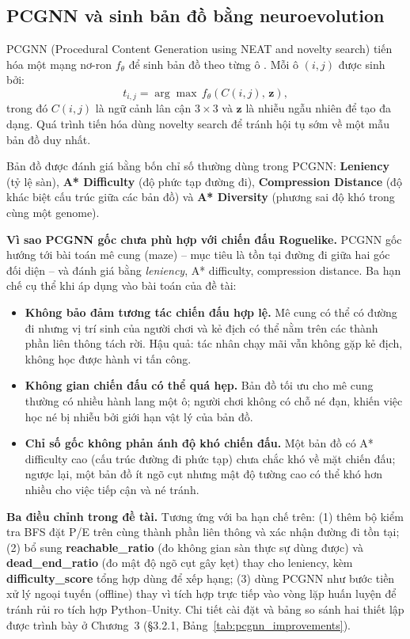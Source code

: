 \subsection{PCGNN và sinh bản đồ bằng neuroevolution}

PCGNN (Procedural Content Generation using NEAT and novelty search) tiến hóa một mạng nơ-ron $f_\theta$ để sinh bản đồ theo từng ô \cite{Beukman2022}. Mỗi ô $(i,j)$ được sinh bởi:
\begin{equation}
    t_{i,j} = \arg\max\, f_\theta(C(i,j),\, \mathbf{z}),
\end{equation}
trong đó $C(i,j)$ là ngữ cảnh lân cận $3\times3$ và $\mathbf{z}$ là nhiễu ngẫu nhiên để tạo đa dạng. Quá trình tiến hóa dùng novelty search để tránh hội tụ sớm về một mẫu bản đồ duy nhất.

Bản đồ được đánh giá bằng bốn chỉ số thường dùng trong PCGNN: \textbf{Leniency} (tỷ lệ sàn), \textbf{A* Difficulty} (độ phức tạp đường đi), \textbf{Compression Distance} (độ khác biệt cấu trúc giữa các bản đồ) và \textbf{A* Diversity} (phương sai độ khó trong cùng một genome).

\textbf{Vì sao PCGNN gốc chưa phù hợp với chiến đấu Roguelike.} PCGNN gốc hướng tới bài toán mê cung (maze) -- mục tiêu là tồn tại đường đi giữa hai góc đối diện -- và đánh giá bằng \emph{leniency}, A* difficulty, compression distance. Ba hạn chế cụ thể khi áp dụng vào bài toán của đề tài:
\begin{itemize}
    \item \textbf{Không bảo đảm tương tác chiến đấu hợp lệ.} Mê cung có thể có đường đi nhưng vị trí sinh của người chơi và kẻ địch có thể nằm trên các thành phần liên thông tách rời. Hậu quả: tác nhân chạy mãi vẫn không gặp kẻ địch, không học được hành vi tấn công.
    \item \textbf{Không gian chiến đấu có thể quá hẹp.} Bản đồ tối ưu cho mê cung thường có nhiều hành lang một ô; người chơi không có chỗ né đạn, khiến việc học né bị nhiễu bởi giới hạn vật lý của bản đồ.
    \item \textbf{Chỉ số gốc không phản ánh độ khó chiến đấu.} Một bản đồ có A* difficulty cao (cấu trúc đường đi phức tạp) chưa chắc khó về mặt chiến đấu; ngược lại, một bản đồ ít ngõ cụt nhưng mật độ tường cao có thể khó hơn nhiều cho việc tiếp cận và né tránh.
\end{itemize}

\textbf{Ba điều chỉnh trong đề tài.} Tương ứng với ba hạn chế trên: (1) thêm bộ kiểm tra BFS đặt P/E trên cùng thành phần liên thông và xác nhận đường đi tồn tại; (2) bổ sung \textbf{reachable\_ratio} (đo không gian sàn thực sự dùng được) và \textbf{dead\_end\_ratio} (đo mật độ ngõ cụt gây kẹt) thay cho leniency, kèm \textbf{difficulty\_score} tổng hợp dùng để xếp hạng; (3) dùng PCGNN như bước tiền xử lý ngoại tuyến (offline) thay vì tích hợp trực tiếp vào vòng lặp huấn luyện để tránh rủi ro tích hợp Python--Unity. Chi tiết cài đặt và bảng so sánh hai thiết lập được trình bày ở Chương~3 (§3.2.1, Bảng~\ref{tab:pcgnn_improvements}).

